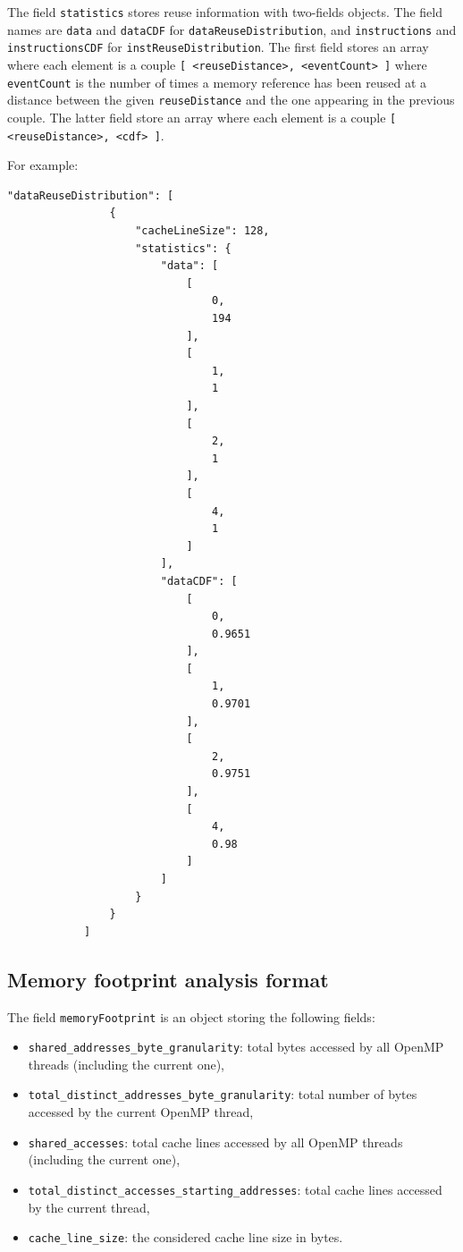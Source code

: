 \documentclass[a4paper, 10pt]{article}
\begin{document}
The field \verb!statistics! stores reuse information with two-fields objects. The field names are \verb!data! and \verb!dataCDF!
for \texttt{dataReuseDistribution}, and \verb!instructions! and \verb!instructionsCDF! for \texttt{instReuseDistribution}.
The first field stores an array where each element is a couple \verb![ <reuseDistance>, <eventCount> ]! where \verb!eventCount!
is the number of times a memory reference has been reused at a distance between the given \verb!reuseDistance! and the one appearing
in the previous couple. The latter field store an array where each element is a couple \verb![ <reuseDistance>, <cdf> ]!.

For example:
\begin{Verbatim}[obeytabs, tabsize=2, frame=lines]
			"dataReuseDistribution": [
				{
					"cacheLineSize": 128,
					"statistics": {
						"data": [
							[
								0,
								194
							],
							[
								1,
								1
							],
							[
								2,
								1
							],
							[
								4,
								1
							]
						],
						"dataCDF": [
							[
								0,
								0.9651
							],
							[
								1,
								0.9701
							],
							[
								2,
								0.9751
							],
							[
								4,
								0.98
							]
						]
					}
				}
			]
\end{Verbatim}


\subsection{Memory footprint analysis format}
\label{sec:pisaFootprint}
The field \verb!memoryFootprint! is an object storing the following fields:
\begin{itemize}
 \item \verb!shared_addresses_byte_granularity!: total bytes accessed by all OpenMP threads (including the current one),
 \item \verb!total_distinct_addresses_byte_granularity!: total number of bytes accessed by the current OpenMP thread,
 \item \verb!shared_accesses!: total cache lines accessed by all OpenMP threads (including the current one),
 \item \verb!total_distinct_accesses_starting_addresses!: total cache lines accessed by the current thread,
 \item \verb!cache_line_size!: the considered cache line size in bytes. 
\end{itemize}
\end{document}
